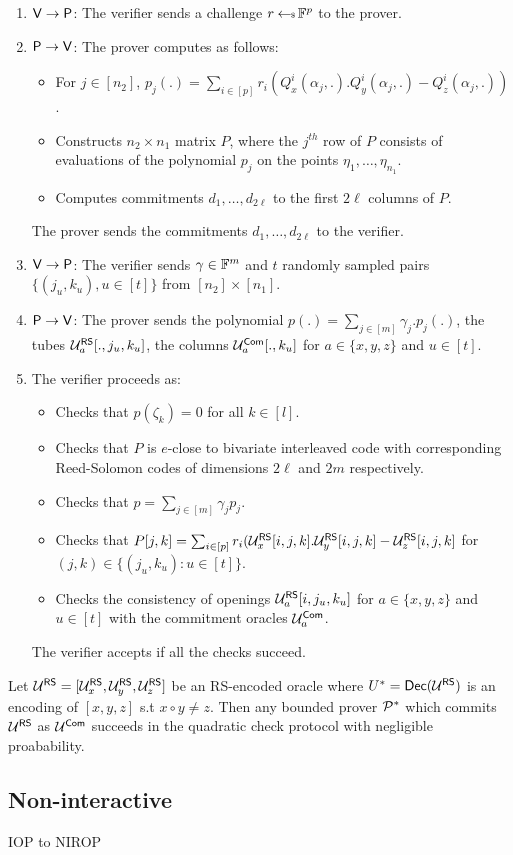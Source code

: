 \begin{enumerate}[{\rm 1.}]
\item $\mathsf{V}\rightarrow\mathsf{P}$: The verifier sends a challenge $r\hskip2.3pt{\gets\!\!\mbox{\tiny${\$}$\normalsize}}\,
\mathbb{F}^p$ to the prover.
\item $\mathsf{P}\rightarrow\mathsf{V}$: The prover computes as follows:
  \begin{itemize}
  \item For $j\in [n_2]$, $p_j(.)=\sum_{i\in [p]}
r_i(Q^i_x(\alpha_j,.).Q^i_y(\alpha_j,.)-Q^i_z(\alpha_j,.))$.
  \item Constructs $n_2\times n_1$ matrix $P$, where the $j^{th}$ row of $P$
consists of evaluations of the polynomial $p_j$ on the points
$\eta_1,\ldots,\eta_{n_1}$.
  \item Computes commitments $d_1,\ldots,d_{2\ell}$ to the first $2\ell$
columns of $P$.
  \end{itemize}
The prover sends the commitments $d_1,\ldots,d_{2\ell}$ to the verifier.

\item $\mathsf{V}\rightarrow\mathsf{P}$: The verifier sends $\gamma\in \mathbb{F}^m$ and
$t$ randomly sampled pairs $\{(j_u,k_u),u\in [t]\}$ from $[n_2]\times [n_1]$. 

\item $\mathsf{P}\rightarrow\mathsf{V}$: The prover sends the polynomial
$p(.)=\sum_{j\in [m]}\gamma_j.p_j(.)$, the tubes $\mathcal{U}^{\mathsf{RS}}_a[.,j_u,k_u]$,
 the columns $\mathcal{U}^{\mathsf{Com}}_a[.,k_u]$ for $a\in\{x,y,z\}$ and $u\in [t]$.

\item The verifier proceeds as:
  \begin{itemize}
  \item Checks that $p(\zeta_k)=0$ for all $k\in [l]$.
  \item Checks that $P$ is $e$-close to bivariate interleaved code with
corresponding Reed-Solomon codes of dimensions $2\ell$ and $2m$ respectively.
  \item Checks that $p=\sum_{j\in [m]}\gamma_jp_j$.
  \item Checks that $P[j,k]=\sum_{i\in
[p]}r_i(\mathcal{U}^{\mathsf{RS}}_x[i,j,k].\mathcal{U}^{\mathsf{RS}}_y[i,j,k]-\mathcal{U}^{\mathsf{RS}}_z[i,j,k]$ for $(j,k)\in
\{(j_u,k_u):u\in [t]\}$.
  \item Checks the consistency of openings $\mathcal{U}^{\mathsf{RS}}_a[i,j_u,k_u]$ for $a\in
\{x,y,z\}$ and $u\in [t]$ with the commitment oracles $\mathcal{U}^{\mathsf{Com}}_a$.
  \end{itemize}
The verifier accepts if all the checks succeed.

\end{enumerate}


\begin{lemma}\label{lem:quadhecksound}
Let $\mathcal{U}^{\mathsf{RS}} = [\mathcal{U}^{\mathsf{RS}}_x,\mathcal{U}^{\mathsf{RS}}_y,\mathcal{U}^{\mathsf{RS}}_z]$ be an RS-encoded oracle where $U^\ast=\mathsf{Dec}(\mathcal{U}^{\mathsf{RS}})$ is
an encoding of $[x,y,z]$ s.t $x\circ y\neq z$. Then any bounded prover $\mathcal{P}^\ast$ which
commits $\mathcal{U}^{\mathsf{RS}}$ as $\mathcal{U}^{\mathsf{Com}}$ succeeds in the quadratic check protocol with
negligible proabability.
\end{lemma}


\subsection{Non-interactive}
IOP to NIROP
